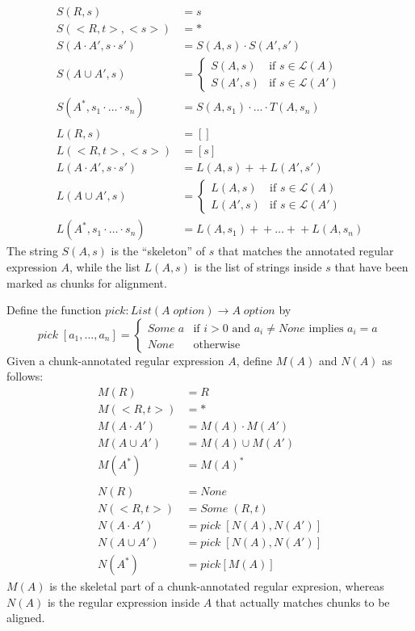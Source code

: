 \documentclass[acmsmall,review,anonymous]{acmart}\settopmatter{printfolios=true,printccs=false,printacmref=false}
\theoremstyle{definition}
\begin{document}
\begin{align*}
S(R, s) &= s\\
S(<R,t>, <s>) &= *\\
S(A \cdot A', s \cdot s') &= S(A, s) \cdot S(A', s')\\
S(A \cup A', s) &=
\begin{cases}
S(A, s) & \text{if } s \in \mathcal{L}(A)\\
S(A', s) & \text{if } s \in \mathcal{L}(A')
\end{cases}\\
S(A^*, s_1 \cdot \ldots \cdot s_n) &= S(A, s_1) \cdot \ldots \cdot T(A, s_n)\\
\\
L(R, s) &= []\\
L(<R,t>, <s>) &= [s]\\
L(A \cdot A', s \cdot s') &=  L(A,s) +\!\!+ L(A',s')\\
L(A \cup A', s) &=
\begin{cases}
L(A, s) & \text{if } s \in \mathcal{L}(A)\\
L(A', s) & \text{if } s \in \mathcal{L}(A')
\end{cases}\\
L(A^*, s_1 \cdot \ldots \cdot s_n) &= L(A, s_1) +\!\!+ \ldots +\!\!+ L(A, s_n)
\end{align*}
The string $S(A, s)$ is the ``skeleton'' of $s$ that matches the annotated regular expression $A$, while the list $L(A, s)$ is the list of strings inside $s$ that have been marked as chunks for alignment.

Define the function $pick : List(A \; option) \longrightarrow A \; option$ by
$$
pick \; [a_1, \ldots, a_n] =
\begin{cases}
Some \; a & \text{if } i > 0 \text{ and }a_i \neq None \text{ implies } a_i = a\\
None &\text{otherwise}
\end{cases}
$$
Given a chunk-annotated regular expression $A$, define $M(A)$ and $N(A)$ as follows:
\begin{align*}
M(R) &= R\\
M(<R,t>) &= *\\
M(A \cdot A') &= M(A) \cdot M(A')\\
M(A \cup A') &= M(A) \cup M(A')\\
M(A^*) &= M(A)^*\\
\\
N(R) &= None\\
N(<R, t>) &= Some \; (R, t)\\
N(A \cdot A') &= pick \; [N(A),N(A')]\\
N(A \cup A') &= pick \; [N(A),N(A')]\\
N(A^*) &= pick [M(A)]
\end{align*}
$M(A)$ is the skeletal part of a chunk-annotated regular expresion, whereas $N(A)$ is the regular expression inside $A$ that actually matches chunks to be aligned.
\end{document}
